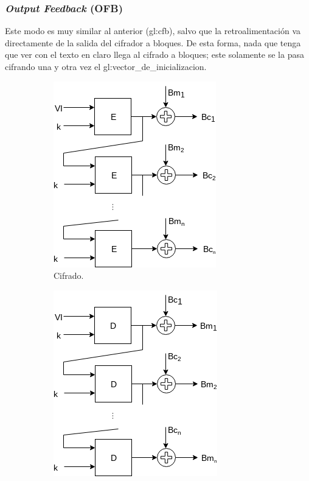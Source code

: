 %
%

\subsubsection{\textit{Output Feedback} (OFB)}
\label{sec:ofb}

Este modo es muy similar al anterior (\gls{gl:cfb}), salvo que la
retroalimentación va directamente de la salida del cifrador a bloques. De esta
forma, nada que tenga que ver con el texto en claro llega al cifrado a bloques;
este solamente se la pasa cifrando una y otra vez el
\gls{gl:vector_de_inicializacion}.

\begin{figure}
  \centering
  \begin{subfigure}{0.45\textwidth}
    \begin{center}
      \includegraphics[width=0.7\linewidth]{diagramas/modo_ofb.png}
      \caption{Cifrado.}
    \end{center}
  \end{subfigure}
  \begin{subfigure}{0.45\textwidth}
    \begin{center}
      \includegraphics[width=0.7\linewidth]{diagramas/modo_ofb_inverso.png}

\end{center}
\end{subfigure}
\end{figure}

